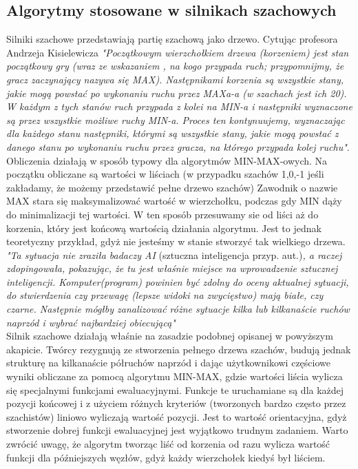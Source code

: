 \documentclass[12pt,leqno]{article}
\begin{document}
\subsection{Algorytmy stosowane w silnikach szachowych}
Silniki szachowe przedstawiają partię szachową jako drzewo. Cytując profesora Andrzeja Kisielewicza\cite{4} {\it "Początkowym wierzchołkiem drzewa  (korzeniem) jest stan początkowy gry (wraz ze wskazaniem , na kogo przypada ruch; przypomnijmy, że gracz zaczynający nazywa się MAX). Następnikami korzenia są wszystkie stany, jakie mogą powstać po wykonaniu ruchu przez MAXa-a (w szachach jest ich 20). W każdym z tych stanów ruch przypada z kolei na MIN-a i następniki wyznaczone są przez wszystkie możliwe ruchy MIN-a. Proces ten kontynuujemy, wyznaczając dla każdego stanu następniki, którymi są wszystkie stany, jakie mogą powstać z danego stanu po wykonaniu ruchu przez gracza, na którego przypada kolej ruchu"}. \\
Obliczenia działają w sposób typowy dla algorytmów MIN-MAX-owych. Na początku obliczane są wartości w liściach (w przypadku szachów 1,0,-1 jeśli zakładamy, że możemy przedstawić pełne drzewo szachów) Zawodnik o nazwie MAX stara się maksymalizować wartość w wierzchołku, podczas gdy MIN dąży do minimalizacji tej wartości. W ten sposób przesuwamy sie od liści aż do korzenia, który jest końcową wartością działania algorytmu. Jest to jednak teoretyczny przykład, gdyż nie jesteśmy w stanie stworzyć tak wielkiego drzewa.\\ \cite{4} {\it "Ta sytuacja nie zraziła badaczy AI} (sztuczna inteligencja przyp. aut.){\it , a raczej zdopingowała, pokazując, że tu jest właśnie miejsce na wprowadzenie sztucznej inteligencji. Komputer(program) powinien być zdolny do oceny aktualnej sytuacji, do stwierdzenia czy przewagę (lepsze widoki na zwycięstwo) mają białe, czy czarne.  Następnie mógłby zanalizować różne sytuacje kilka lub kilkanaście ruchów naprzód i wybrać najbardziej obiecującą" } \\
Silnik szachowe działają właśnie na zasadzie podobnej opisanej w powyższym akapicie. Twórcy rezygnują ze stworzenia pełnego drzewa szachów, budują jednak strukturę na kilkanaście półruchów naprzód i dając użytkownikowi częściowe wyniki obliczane za pomocą algorytmu MIN-MAX, gdzie wartości liścia wylicza się specjalnymi funkcjami ewaluacyjnymi. Funkcje te uruchamiane są dla każdej pozycji końcowej i z użyciem różnych kryteriów (tworzonych bardzo często przez szachistów) liniowo wyliczają wartość pozycji. Jest to wartość orientacyjna, gdyż stworzenie dobrej funkcji ewaluacyjnej jest wyjątkowo trudnym zadaniem. Warto zwrócić uwagę, że algorytm tworząc liść od korzenia od razu wylicza wartość funkcji dla późniejszych węzłów, gdyż każdy wierzchołek kiedyś był liściem. \\
\end{document}
